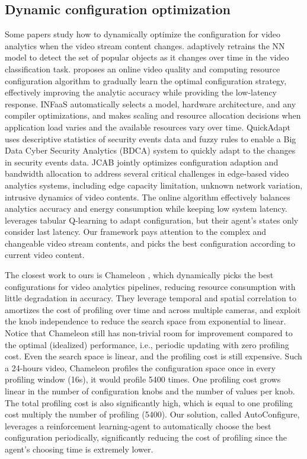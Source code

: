 \subsection{Dynamic configuration optimization}
Some papers study how to dynamically optimize the configuration for video analytics when the video stream content changes. \cite{shen2017retrain_model} adaptively retrains the NN model to detect the set of popular objects as it changes over time in the video classification task. \cite{yang2019edge_coordinated} proposes an online video quality and computing resource configuration algorithm to gradually learn the optimal configuration strategy, effectively improving the analytic accuracy while providing the low-latency response. INFaaS \cite{romero2019infaas} automatically selects a model, hardware architecture, and any compiler optimizations, and makes scaling and resource allocation decisions when application load varies and the available resources vary over time. QuickAdapt \cite{ullah2019quickadapt} uses
descriptive statistics of security events data and fuzzy rules to
enable a Big Data Cyber Security Analytics (BDCA) system to quickly adapt to the changes in security events data. JCAB \cite{wang2020jcab} jointly optimizes configuration adaption and bandwidth allocation to address several critical challenges in edge-based video analytics systems, including edge capacity limitation, unknown network variation, intrusive dynamics of video contents. The online algorithm effectively balances analytics accuracy and energy consumption while keeping low system latency. \cite{argerich2019orchestration} leverages tabular Q-learning to adapt configuration, but their agent's states only consider last latency. Our framework pays attention to the complex and changeable video stream contents, and picks the best configuration according to current video content. 

The closest work to ours is Chameleon \cite{jiang2018chameleon}, which dynamically picks the best configurations for video analytics pipelines, reducing resource consumption with little degradation in accuracy. They leverage temporal and spatial correlation to amortizes the cost of profiling over time and across multiple cameras, and exploit the knob independence to reduce the search space from exponential to linear.\cite{jiang2018chameleon} Notice that Chameleon still has non-trivial room for improvement compared to the optimal (idealized) performance, i.e.,
periodic updating with zero profiling cost. Even the search space is linear, and the profiling cost is still expensive. Such a 24-hours video, Chameleon profiles the configuration space once in every profiling window (16s), it would profile 5400 times. One profiling cost grows linear in the number of configuration knobs and the number of values per knob. The total profiling cost is also significantly high, which is equal to one profiling cost multiply the number of profiling (5400). Our solution, called AutoConfigure, leverages a reinforcement learning-agent to automatically choose the best configuration periodically, significantly reducing the cost of profiling since the agent's choosing time is extremely lower. 

